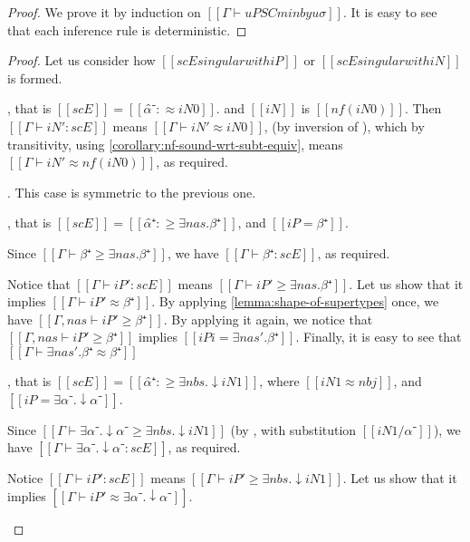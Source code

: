 \obsMinInstDeterministic*
\begin{proof}
    We prove it by induction on $[[Γ ⊢ uP SC minby uσ]]$.
    It is easy to see that each inference rule is deterministic.
\end{proof}

\lemEntrySingularitySoundness*
\begin{proof}
    Let us consider how $[[scE singular with iP]]$ or $[[scE singular with iN]]$ is formed.
    \begin{caseof}
        \item {}, that is $[[scE]] = [[α̂⁻ :≈ iN0]]$.
            and $[[iN]]$ is $[[nf(iN0)]]$.
            Then $[[Γ ⊢ iN' : scE]]$ means $[[Γ ⊢ iN' ≈ iN0]]$, 
            (by inversion of ),
            which by transitivity, using \cref{corollary:nf-sound-wrt-subt-equiv},
            means $[[Γ ⊢ iN' ≈ nf(iN0)]]$, 
            as required.
        \item {}. This case is symmetric to the previous one.

        \item {}, that is 
            $[[scE]] = [[α̂⁺ :≥ ∃nas.β⁺]]$, and $[[iP = β⁺]]$.

            Since $[[Γ ⊢ β⁺ ≥  ∃nas.β⁺]]$, we have $[[Γ ⊢ β⁺ : scE ]]$, 
            as required.

            Notice that $[[Γ ⊢ iP' : scE]]$ means $[[Γ ⊢ iP' ≥ ∃nas.β⁺]]$.
            Let us show that it implies $[[Γ ⊢ iP' ≈ β⁺]]$.
            By applying \cref{lemma:shape-of-supertypes} once, 
            we have $[[Γ, nas ⊢ iP' ≥ β⁺]]$.
            By applying it again, we notice that
            $[[Γ, nas ⊢ iP' ≥ β⁺]]$ implies $[[iPi = ∃nas'.β⁺]]$.
            Finally, it is easy to see that $[[Γ ⊢ ∃nas'.β⁺ ≈ β⁺]]$

        \item {},
            that is $[[scE]] = [[α̂⁺ :≥ ∃nbs.↓iN1]]$, 
            where $[[iN1 ≈ nbj]]$, and $[[iP = ∃α⁻.↓α⁻]]$.

            Since $[[Γ ⊢ ∃α⁻.↓α⁻ ≥ ∃nbs.↓iN1]]$ 
            (by , with substitution $[[iN1 / α⁻]]$),
            we have $[[Γ ⊢ ∃α⁻.↓α⁻ : scE ]]$, as required.

            Notice $[[Γ ⊢ iP' : scE]]$ means $[[Γ ⊢ iP' ≥ ∃nbs.↓iN1]]$.
            Let us show that it implies $[[Γ ⊢ iP' ≈ ∃α⁻.↓α⁻]]$.


\end{caseof}
\end{proof}

